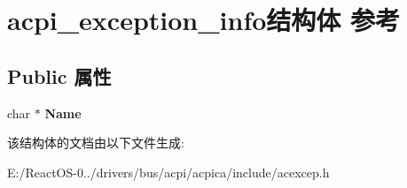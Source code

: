 \hypertarget{structacpi__exception__info}{}\section{acpi\+\_\+exception\+\_\+info结构体 参考}
\label{structacpi__exception__info}
\subsection*{Public 属性}
\begin{DoxyCompactItemize}
\item 
\mbox{\label{structacpi__exception__info_ab65bcb14442329d6daa4aa3f45a3ebf3}} 
char $\ast$ {\bfseries Name}
\end{DoxyCompactItemize}


该结构体的文档由以下文件生成\+:\begin{DoxyCompactItemize}
\item 
E\+:/\+React\+O\+S-\/0../drivers/bus/acpi/acpica/include/acexcep.\+h\end{DoxyCompactItemize}
